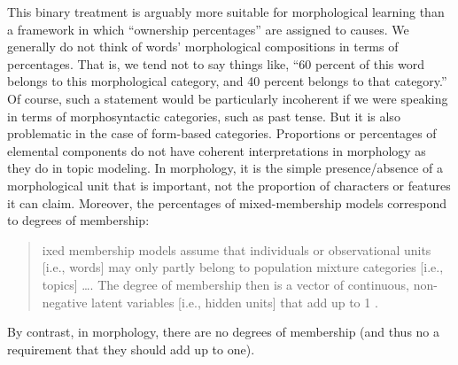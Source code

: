 This binary treatment 
is arguably more suitable for
morphological learning than a framework in which ``ownership percentages'' are assigned to causes.
We generally do not think of words' morphological compositions in 
terms of percentages.  That is, we tend not to say things like, ``60 percent 
of this word belongs to this morphological category, and 40 percent belongs 
to that category.'' Of course, such a statement would be particularly incoherent 
if we were speaking in terms of morphosyntactic categories, such as past tense. 
But it is also problematic in the case of form-based categories. Proportions or percentages of elemental components
do not have coherent interpretations in morphology as they do in topic modeling.
In morphology, it is the simple presence/absence 
of a morphological unit that is important, not the proportion of characters 
or features it can claim. Moreover, the percentages of mixed-membership 
models correspond to degrees of membership:
\begin{quote}\noindent 
[M]ixed membership models assume that individuals or observational units 
[i.e., words] may only partly belong to population mixture categories [i.e., topics] \dots. 
The degree of membership then is a vector of continuous, 
non-negative latent variables [i.e., hidden units] that add up to 1 \citep[][p. 4]{airoldi-et-al:2014}. 
\end{quote}
By contrast, in morphology, there are no degrees of membership (and thus
no a requirement that they should add up to one).

				
